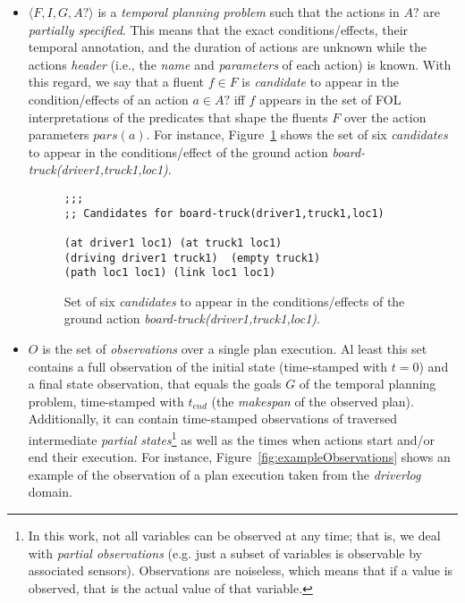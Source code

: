 \documentclass{ecai}
\newcommand{\tup}[1]{{\langle #1 \rangle}}
\begin{document}
\begin{itemize}
\item $\tup{F,I,G,A?}$ is a {\em temporal planning problem} such that the actions in $A?$ are {\em partially specified}. This means that the exact conditions/effects, their temporal annotation, and the duration of actions are unknown while the actions {\em header} (i.e., the {\em  name} and {\em parameters} of each action) is known. With this regard, we say that a fluent $f\in F$ is {\em candidate} to appear in the condition/effects of an action $a\in A?$ iff $f$ appears in the set of FOL interpretations of the predicates that shape the fluents $F$ over the action parameters $pars(a)$. For instance, Figure~\ref{fig:exampleCandidates} shows the set of six {\em candidates} to appear in the conditions/effect of the ground action {\em board-truck(driver1,truck1,loc1)}.
 
\begin{figure}[hbt!]
\begin{footnotesize}    
\begin{verbatim}
;;;
;; Candidates for board-truck(driver1,truck1,loc1)

(at driver1 loc1) (at truck1 loc1) 
(driving driver1 truck1)  (empty truck1) 
(path loc1 loc1) (link loc1 loc1)
\end{verbatim}
\end{footnotesize}    
\caption{Set of six {\em candidates} to appear in the conditions/effects of the ground action {\em board-truck(driver1,truck1,loc1)}.}
\label{fig:exampleCandidates}
\end{figure}  
 
\item $O$ is the set of {\em observations} over a single plan execution. Al least this set contains a full observation of the initial state (time-stamped with $t=0$) and a final state observation, that equals the goals $G$ of the temporal planning problem, time-stamped with $t_{end}$ (the {\em makespan} of the observed plan). Additionally, it can contain time-stamped observations of traversed intermediate {\em partial states}\footnote{In this work, not all variables can be observed at any time; that is, we deal with {\em partial observations} (e.g. just a subset of variables is observable by associated sensors). Observations are noiseless, which means that if a value is observed, that is the actual value of that variable.} as well as the times when actions start and/or end their execution. For instance, Figure~\ref{fig:exampleObservations} shows an example of the observation of a plan execution taken from the {\em driverlog} domain.


\end{itemize}
\end{document}
